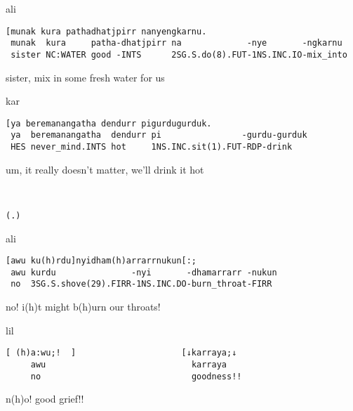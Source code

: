 \documentclass[output=paper,nonflat,colorlinks,citecolor=brown]{langsci/langscibook}
\begin{document}
\vspace{-1mm}
%
\begin{mdframednoverticalspace}[style=firstfoc]
\begin{transbox}{1}{ali}
\begin{verbatim}
[munak kura pathadhatjpirr nanyengkarnu.
 munak  kura     patha-dhatjpirr na             -nye       -ngkarnu
 sister NC:WATER good -INTS      2SG.S.do(8).FUT-1NS.INC.IO-mix_into
\end{verbatim}
\hspace{0.07cm} sister, mix in some fresh water for us
\end{transbox}
%
\xtransbox{2}{~}{[((points to water-bottle/vehicle))}
\end{mdframednoverticalspace}
%
%
\begin{mdframednoverticalspace}[style=secondfoc]
\begin{transbox}{4}{kar}
\begin{verbatim}
[ya beremanangatha dendurr pigurdugurduk.
 ya  beremanangatha  dendurr pi                -gurdu-gurduk
 HES never_mind.INTS hot     1NS.INC.sit(1).FUT-RDP-drink
\end{verbatim}
\hspace{0.07cm} um, it really doesn't matter, we’ll drink it hot
\end{transbox}
%
\xtransbox{5}{~}{[((points into billycan))}
\end{mdframednoverticalspace}
%
\begin{transbox}{6}{~}
\begin{verbatim}
(.)
\end{verbatim}
\end{transbox}
%
\begin{transbox}{7}{ali}
\begin{verbatim}
[awu ku(h)rdu]nyidham(h)arrarrnukun[:;
 awu kurdu               -nyi       -dhamarrarr -nukun
 no  3SG.S.shove(29).FIRR-1NS.INC.DO-burn_throat-FIRR
\end{verbatim}
\hspace{0.07cm} no! i(h)t might b(h)urn our throats!
\end{transbox}
%
\begin{transbox}{8}{lil}
\begin{verbatim}
[ (h)a:wu;!  ]                     [↓karraya;↓
     awu                             karraya
     no                              goodness!!
\end{verbatim}
\hspace{0.65cm} n(h)o! \hspace{3.85cm} good grief!!
\end{transbox}\bigskip
\end{document}
